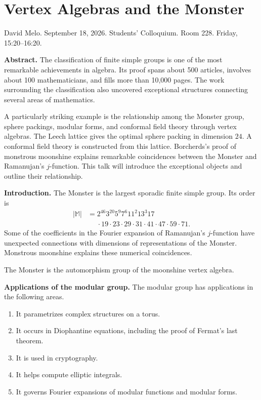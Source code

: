 \section{Vertex Algebras and the Monster}
\label{section-vertex-algebras-monster}

\noindent
David Melo. September 18, 2026.
Students' Colloquium. Room 228.
Friday, 15:20--16:20.

\medskip\noindent
{\bf Abstract.}
The classification of finite simple groups is
one of the most remarkable achievements in
algebra. Its proof spans about 500 articles,
involves about 100 mathematicians, and fills
more than 10,000 pages. The work surrounding
the classification also uncovered exceptional
structures connecting several areas of
mathematics.

A particularly striking example is the
relationship among the Monster group, sphere
packings, modular forms, and conformal field
theory through vertex algebras. The Leech
lattice gives the optimal sphere packing in
dimension $24$. A conformal field theory is
constructed from this lattice. Borcherds's
proof of monstrous moonshine explains
remarkable coincidences between the
Monster and Ramanujan's $j$-function. This
talk will introduce the exceptional objects
and outline their relationship.

\medskip\noindent
{\bf Introduction.}
The Monster is the largest sporadic finite
simple group. Its order is
$$
\begin{aligned}
|\mathbb{M}|
&=2^{46}3^{20}5^9 7^6 11^2 13^3 17\\
&\phantom{={}}\cdot19\cdot23\cdot29\cdot31
\cdot41\cdot47\cdot59\cdot71.
\end{aligned}
$$
Some of the coefficients in the Fourier
expansion of Ramanujan's $j$-function have
unexpected connections with dimensions of
representations of the Monster. Monstrous
moonshine explains these numerical
coincidences.

The Monster is the automorphism group of the
moonshine vertex algebra.

\medskip\noindent
{\bf Applications of the modular group.}
The modular group has applications in the
following areas.

\begin{enumerate}
\item
It parametrizes complex structures on a
torus.

\item
It occurs in Diophantine equations, including
the proof of Fermat's last theorem.

\item
It is used in cryptography.

\item
It helps compute elliptic integrals.

\item
It governs Fourier expansions of modular
functions and modular forms.
\end{enumerate}

